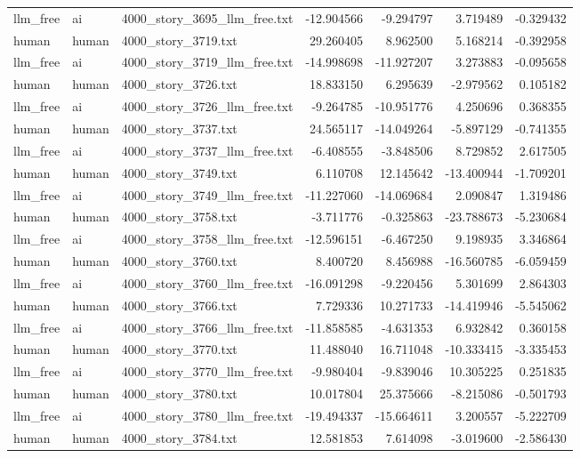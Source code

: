 \begin{longtable}{lllrrrr}
llm\_free & ai & 4000\_story\_3695\_llm\_free.txt & -12.904566 & -9.294797 & 3.719489 & -0.329432 \\
human & human & 4000\_story\_3719.txt & 29.260405 & 8.962500 & 5.168214 & -0.392958 \\
llm\_free & ai & 4000\_story\_3719\_llm\_free.txt & -14.998698 & -11.927207 & 3.273883 & -0.095658 \\
human & human & 4000\_story\_3726.txt & 18.833150 & 6.295639 & -2.979562 & 0.105182 \\
llm\_free & ai & 4000\_story\_3726\_llm\_free.txt & -9.264785 & -10.951776 & 4.250696 & 0.368355 \\
human & human & 4000\_story\_3737.txt & 24.565117 & -14.049264 & -5.897129 & -0.741355 \\
llm\_free & ai & 4000\_story\_3737\_llm\_free.txt & -6.408555 & -3.848506 & 8.729852 & 2.617505 \\
human & human & 4000\_story\_3749.txt & 6.110708 & 12.145642 & -13.400944 & -1.709201 \\
llm\_free & ai & 4000\_story\_3749\_llm\_free.txt & -11.227060 & -14.069684 & 2.090847 & 1.319486 \\
human & human & 4000\_story\_3758.txt & -3.711776 & -0.325863 & -23.788673 & -5.230684 \\
llm\_free & ai & 4000\_story\_3758\_llm\_free.txt & -12.596151 & -6.467250 & 9.198935 & 3.346864 \\
human & human & 4000\_story\_3760.txt & 8.400720 & 8.456988 & -16.560785 & -6.059459 \\
llm\_free & ai & 4000\_story\_3760\_llm\_free.txt & -16.091298 & -9.220456 & 5.301699 & 2.864303 \\
human & human & 4000\_story\_3766.txt & 7.729336 & 10.271733 & -14.419946 & -5.545062 \\
llm\_free & ai & 4000\_story\_3766\_llm\_free.txt & -11.858585 & -4.631353 & 6.932842 & 0.360158 \\
human & human & 4000\_story\_3770.txt & 11.488040 & 16.711048 & -10.333415 & -3.335453 \\
llm\_free & ai & 4000\_story\_3770\_llm\_free.txt & -9.980404 & -9.839046 & 10.305225 & 0.251835 \\
human & human & 4000\_story\_3780.txt & 10.017804 & 25.375666 & -8.215086 & -0.501793 \\
llm\_free & ai & 4000\_story\_3780\_llm\_free.txt & -19.494337 & -15.664611 & 3.200557 & -5.222709 \\
human & human & 4000\_story\_3784.txt & 12.581853 & 7.614098 & -3.019600 & -2.586430 \\

\end{longtable}

